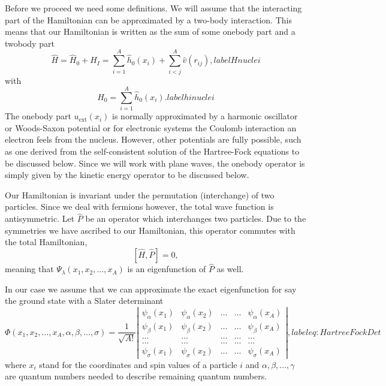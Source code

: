 Before we proceed we need some definitions.
We will assume that the interacting part of the Hamiltonian
can be approximated by a two-body interaction.
This means that our Hamiltonian is written as the sum of some onebody part and a twobody part
\begin{equation}
    \hat{H} = \hat{H}_0 + \hat{H}_I 
    = \sum_{i=1}^A \hat{h}_0(x_i) + \sum_{i < j}^A \hat{v}(r_{ij}),
label{Hnuclei}
\end{equation}
with 
\begin{equation}
  H_0=\sum_{i=1}^A \hat{h}_0(x_i).
label{hinuclei}
\end{equation}
The onebody part $u_{\mathrm{ext}}(x_i)$ is normally approximated by a harmonic oscillator or Woods-Saxon potential or for electronic systems the Coulomb interaction an electron feels from the nucleus. However, other potentials are fully possible, such as 
one derived from the self-consistent solution of the Hartree-Fock equations to be discussed below. Since we will work with plane waves, the onebody operator
is simply given by the kinetic energy operator to be discussed below. 

Our Hamiltonian is invariant under the permutation (interchange) of two particles.
Since we deal with fermions however, the total wave function is antisymmetric.
Let $\hat{P}$ be an operator which interchanges two particles.
Due to the symmetries we have ascribed to our Hamiltonian, this operator commutes with the total Hamiltonian,
\[
[\hat{H},\hat{P}] = 0,
 \]
meaning that $\Psi_{\lambda}(x_1, x_2, \dots , x_A)$ is an eigenfunction of 
$\hat{P}$ as well.

In our case we assume that  we can approximate the exact eigenfunction for say the ground state with a Slater determinant
\begin{equation}
   \Phi(x_1, x_2,\dots ,x_A,\alpha,\beta,\dots, \sigma)=\frac{1}{\sqrt{A!}}
\left| \begin{array}{ccccc} \psi_{\alpha}(x_1)& \psi_{\alpha}(x_2)& \dots & \dots & \psi_{\alpha}(x_A)\\
                            \psi_{\beta}(x_1)&\psi_{\beta}(x_2)& \dots & \dots & \psi_{\beta}(x_A)\\  
                            \dots & \dots & \dots & \dots & \dots \\
                            \dots & \dots & \dots & \dots & \dots \\
                     \psi_{\sigma}(x_1)&\psi_{\sigma}(x_2)& \dots & \dots & \psi_{\sigma}(x_A)\end{array} \right|, label{eq:HartreeFockDet}
\end{equation}
where  $x_i$  stand for the coordinates and spin values of a particle $i$ and $\alpha,\beta,\dots, \gamma$ 
are quantum numbers needed to describe remaining quantum numbers.  


